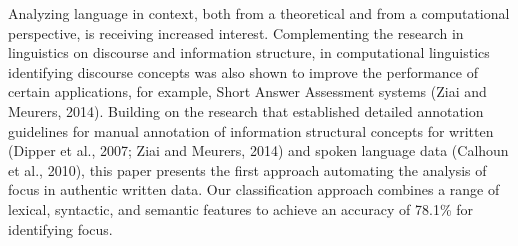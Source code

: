 Analyzing language in context, both from a theoretical and from a computational perspective, is receiving increased interest. Complementing the research in linguistics on discourse and information structure, in computational linguistics identifying discourse concepts was also shown to improve the performance of certain applications, for example, Short Answer Assessment systems (Ziai and Meurers, 2014). Building on the research that established detailed annotation guidelines for manual annotation of information structural concepts for written (Dipper et al., 2007; Ziai and Meurers, 2014) and spoken language data (Calhoun et al., 2010), this paper presents the first approach automating the analysis of focus in authentic written data. Our classification approach combines a range of lexical, syntactic, and semantic features to achieve an accuracy of 78.1\% for identifying focus.
